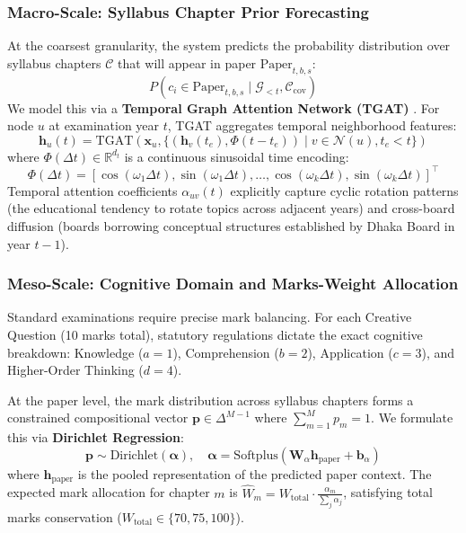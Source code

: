 \documentclass[11pt,a4paper]{article}
\begin{document}
\subsubsection{Macro-Scale: Syllabus Chapter Prior Forecasting}
At the coarsest granularity, the system predicts the probability distribution over syllabus chapters $\mathcal{C}$ that will appear in paper $\text{Paper}_{t, b, s}$:
\begin{equation}
    P(c_i \in \text{Paper}_{t, b, s} \mid \mathcal{G}_{<t}, \mathcal{C}_{\text{cov}})
\end{equation}
We model this via a \textbf{Temporal Graph Attention Network (TGAT)} \cite{xu2020tgat, sankar2020dysat}. For node $u$ at examination year $t$, TGAT aggregates temporal neighborhood features:
\begin{equation}
    \mathbf{h}_u(t) = \text{TGAT}\left( \mathbf{x}_u, \{ (\mathbf{h}_v(t_e), \Phi(t - t_e)) \mid v \in \mathcal{N}(u), t_e < t \} \right)
\end{equation}
where $\Phi(\Delta t) \in \mathbb{R}^{d_t}$ is a continuous sinusoidal time encoding:
\begin{equation}
    \Phi(\Delta t) = \left[ \cos(\omega_1 \Delta t), \sin(\omega_1 \Delta t), \dots, \cos(\omega_k \Delta t), \sin(\omega_k \Delta t) \right]^\top
\end{equation}
Temporal attention coefficients $\alpha_{uv}(t)$ explicitly capture cyclic rotation patterns (the educational tendency to rotate topics across adjacent years) and cross-board diffusion (boards borrowing conceptual structures established by Dhaka Board in year $t-1$).

\subsubsection{Meso-Scale: Cognitive Domain and Marks-Weight Allocation}
Standard examinations require precise mark balancing. For each Creative Question (10 marks total), statutory regulations dictate the exact cognitive breakdown: Knowledge ($a=1$), Comprehension ($b=2$), Application ($c=3$), and Higher-Order Thinking ($d=4$).

At the paper level, the mark distribution across syllabus chapters forms a constrained compositional vector $\mathbf{p} \in \Delta^{M-1}$ where $\sum_{m=1}^M p_m = 1$. We formulate this via \textbf{Dirichlet Regression}:
\begin{equation}
    \mathbf{p} \sim \text{Dirichlet}(\boldsymbol{\alpha}), \quad \boldsymbol{\alpha} = \text{Softplus}(\mathbf{W}_\alpha \mathbf{h}_{\text{paper}} + \mathbf{b}_\alpha)
\end{equation}
where $\mathbf{h}_{\text{paper}}$ is the pooled representation of the predicted paper context. The expected mark allocation for chapter $m$ is $\hat{W}_m = W_{\text{total}} \cdot \frac{\alpha_m}{\sum_j \alpha_j}$, satisfying total marks conservation ($W_{\text{total}} \in \{70, 75, 100\}$).
\end{document}
